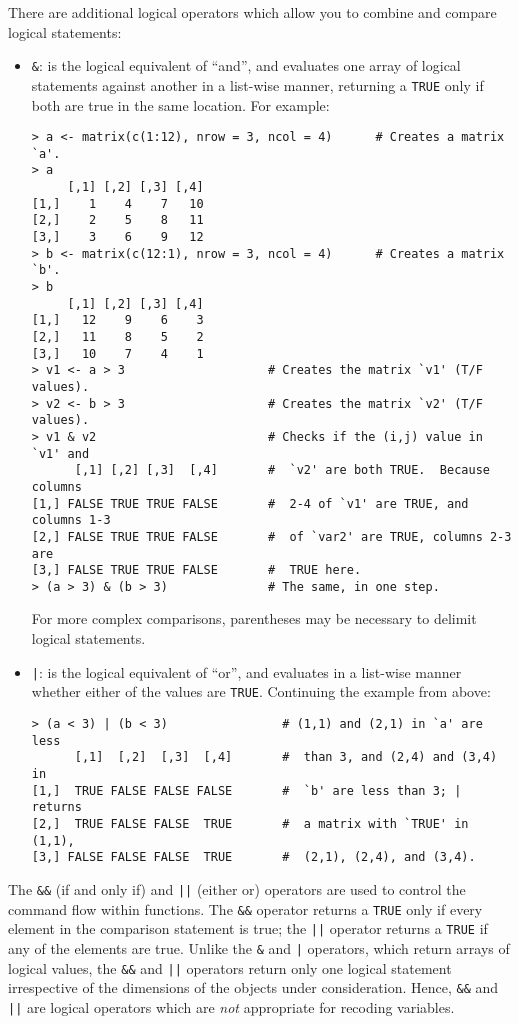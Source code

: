 \documentclass{article}
\begin{document}
There are additional logical operators which allow you to combine and
compare logical statements:
\begin{itemize}
\item {\tt \&}: is the logical equivalent of ``and'', and evaluates
one array of logical statements against another in a list-wise manner,
returning a {\tt TRUE} only if both are true in the same location.  For example:
\begin{verbatim}
> a <- matrix(c(1:12), nrow = 3, ncol = 4)      # Creates a matrix `a'.  
> a
     [,1] [,2] [,3] [,4]
[1,]    1    4    7   10
[2,]    2    5    8   11
[3,]    3    6    9   12
> b <- matrix(c(12:1), nrow = 3, ncol = 4)      # Creates a matrix `b'.  
> b
     [,1] [,2] [,3] [,4]
[1,]   12    9    6    3
[2,]   11    8    5    2
[3,]   10    7    4    1
> v1 <- a > 3                    # Creates the matrix `v1' (T/F values). 
> v2 <- b > 3                    # Creates the matrix `v2' (T/F values). 
> v1 & v2                        # Checks if the (i,j) value in `v1' and 
      [,1] [,2] [,3]  [,4]       #  `v2' are both TRUE.  Because columns 
[1,] FALSE TRUE TRUE FALSE       #  2-4 of `v1' are TRUE, and columns 1-3
[2,] FALSE TRUE TRUE FALSE       #  of `var2' are TRUE, columns 2-3 are
[3,] FALSE TRUE TRUE FALSE       #  TRUE here.  
> (a > 3) & (b > 3)              # The same, in one step.  
\end{verbatim}
  For more complex comparisons, parentheses may be necessary to
  delimit logical statements.
  
\item {\tt |}: is the logical equivalent of ``or'', and evaluates in a
list-wise manner whether either of the
  values are {\tt TRUE}.  Continuing the example from above:
\begin{verbatim}
> (a < 3) | (b < 3)                # (1,1) and (2,1) in `a' are less
      [,1]  [,2]  [,3]  [,4]       #  than 3, and (2,4) and (3,4) in
[1,]  TRUE FALSE FALSE FALSE       #  `b' are less than 3; | returns
[2,]  TRUE FALSE FALSE  TRUE       #  a matrix with `TRUE' in (1,1),
[3,] FALSE FALSE FALSE  TRUE       #  (2,1), (2,4), and (3,4).  
\end{verbatim}
\end{itemize}
The {\tt \&\&} (if and only if) and {\tt ||} (either or) operators are
used to control the command flow within functions.  The {\tt \&\&}
operator returns a {\tt TRUE} only if every element in the comparison
statement is true; the {\tt ||} operator returns a {\tt TRUE} if any
of the elements are true.  Unlike the {\tt \&} and {\tt |} operators,
which return arrays of logical values, the {\tt \&\&} and {\tt ||}
operators return only one logical statement irrespective of the
dimensions of the objects under consideration.  Hence, {\tt \&\&} and
{\tt ||} are logical operators which are \emph{not} appropriate for
recoding variables.
\end{document}
